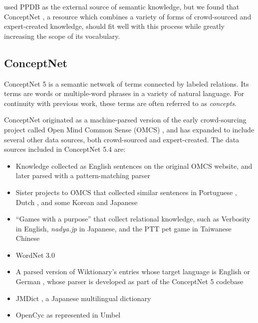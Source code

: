 \documentclass[letterpaper]{article}
\begin{document}
 used PPDB \cite{ganitkevitch2013ppdb} as
the external source of semantic knowledge, but we found that ConceptNet
\cite{speer2012conceptnet}, a resource which combines a variety of forms of
crowd-sourced and expert-created knowledge, should fit well with this process
while greatly increasing the scope of its vocabulary.

\subsection{ConceptNet}
ConceptNet 5 \cite{speer2012conceptnet} is a semantic network of terms
connected by labeled relations. Its terms are words or multiple-word phrases
in a variety of natural language. For continuity with previous work,
these terms are often referred to as {\em concepts}.

ConceptNet originated as a machine-parsed version of the early crowd-sourcing
project called Open Mind Common Sense (OMCS) \cite{singh2002omcs}, and has expanded
to include several other data sources, both crowd-sourced and expert-created.
The data sources included in ConceptNet 5.4 are:

\begin{itemize}
\item Knowledge collected as English sentences on the original OMCS website,
    and later parsed with a pattern-matching parser
\item Sister projects to OMCS that collected similar sentences in Portuguese
    \cite{anacleto2006portuguese},
    Dutch \cite{eckhardt2008kid}, and some Korean and Japanese
    \cite{chung2006globalmind}
\item ``Games with a purpose'' that collect relational knowledge, such as
    Verbosity \cite{vonahn2006verbosity} in English, {\em nadya.jp}
    \cite{nakahara2011nadya} in Japanese, and the PTT pet game \cite{kuo2009petgame}
    in Taiwanese Chinese
\item WordNet 3.0 \cite{miller1998wordnet}
\item A parsed version of Wiktionary's entries whose target language is English
    or German \cite{wiktionary2014en} \cite{wiktionary2014de}, whose parser is
    developed as part of the ConceptNet 5 codebase
\item JMDict \cite{breen2004jmdict}, a Japanese multilingual dictionary
\item OpenCyc \cite{matuszek2006cyc} as represented in Umbel \cite{bergman2008umbel}
\end{itemize}
\end{document}
